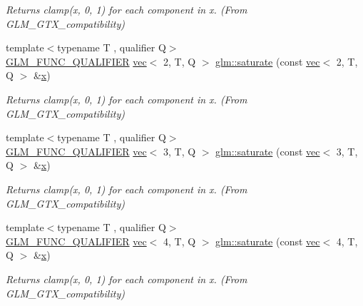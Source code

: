 \begin{DoxyCompactItemize}
\begin{DoxyCompactList}\small\item\em Returns clamp(x, 0, 1) for each component in x. (From G\+L\+M\+\_\+\+G\+T\+X\+\_\+compatibility) \end{DoxyCompactList}\item 
{\footnotesize template$<$typename T , qualifier Q$>$ }\\\mbox{\hyperlink{setup_8hpp_a33fdea6f91c5f834105f7415e2a64407}{G\+L\+M\+\_\+\+F\+U\+N\+C\+\_\+\+Q\+U\+A\+L\+I\+F\+I\+ER}} \mbox{\hyperlink{structglm_1_1vec}{vec}}$<$ 2, T, Q $>$ \mbox{\hyperlink{group__gtx__compatibility_gaee97b8001c794a78a44f5d59f62a8aba}{glm\+::saturate}} (const \mbox{\hyperlink{structglm_1_1vec}{vec}}$<$ 2, T, Q $>$ \&\mbox{\hyperlink{_s_d_l__opengl_8h_ad0e63d0edcdbd3d79554076bf309fd47}{x}})
\begin{DoxyCompactList}\small\item\em Returns clamp(x, 0, 1) for each component in x. (From G\+L\+M\+\_\+\+G\+T\+X\+\_\+compatibility) \end{DoxyCompactList}\item 
{\footnotesize template$<$typename T , qualifier Q$>$ }\\\mbox{\hyperlink{setup_8hpp_a33fdea6f91c5f834105f7415e2a64407}{G\+L\+M\+\_\+\+F\+U\+N\+C\+\_\+\+Q\+U\+A\+L\+I\+F\+I\+ER}} \mbox{\hyperlink{structglm_1_1vec}{vec}}$<$ 3, T, Q $>$ \mbox{\hyperlink{group__gtx__compatibility_ga39bfe3a421286ee31680d45c31ccc161}{glm\+::saturate}} (const \mbox{\hyperlink{structglm_1_1vec}{vec}}$<$ 3, T, Q $>$ \&\mbox{\hyperlink{_s_d_l__opengl_8h_ad0e63d0edcdbd3d79554076bf309fd47}{x}})
\begin{DoxyCompactList}\small\item\em Returns clamp(x, 0, 1) for each component in x. (From G\+L\+M\+\_\+\+G\+T\+X\+\_\+compatibility) \end{DoxyCompactList}\item 
{\footnotesize template$<$typename T , qualifier Q$>$ }\\\mbox{\hyperlink{setup_8hpp_a33fdea6f91c5f834105f7415e2a64407}{G\+L\+M\+\_\+\+F\+U\+N\+C\+\_\+\+Q\+U\+A\+L\+I\+F\+I\+ER}} \mbox{\hyperlink{structglm_1_1vec}{vec}}$<$ 4, T, Q $>$ \mbox{\hyperlink{group__gtx__compatibility_ga356f8c3a7e7d6376d3d4b0a026407183}{glm\+::saturate}} (const \mbox{\hyperlink{structglm_1_1vec}{vec}}$<$ 4, T, Q $>$ \&\mbox{\hyperlink{_s_d_l__opengl_8h_ad0e63d0edcdbd3d79554076bf309fd47}{x}})
\begin{DoxyCompactList}\small\item\em Returns clamp(x, 0, 1) for each component in x. (From G\+L\+M\+\_\+\+G\+T\+X\+\_\+compatibility) \end{DoxyCompactList}\item 

\end{DoxyCompactItemize}
